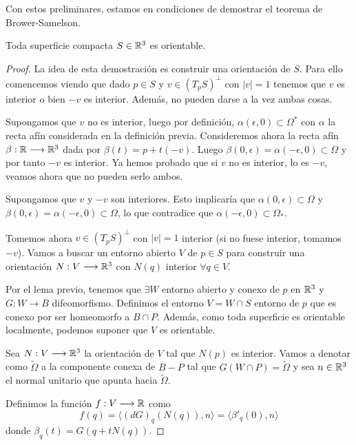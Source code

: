 Con estos preliminares, estamos en condiciones de demostrar el teorema de Brower-Samelson.

\begin{theorem}\label{browersamelson}
Toda superficie compacta $S \in \mathbb{R}^3$ es orientable.
\end{theorem}
\begin{proof}
La idea de esta demostración es construir una orientación de $S$. Para ello comencemos viendo que dado $p \in S$ y $v \in (T_pS)^{\bot}$ con $|v|=1$ tenemos que $v$ es interior o bien $-v$ es interior. Además, no pueden darse a la vez ambas cosas.

Supongamos que $v$ no es interior, luego por definición, $\alpha(\epsilon, 0) \subset \Omega^{*}$ con $\alpha$ la recta afín considerada en la definición previa. Consideremos ahora la recta afín $\beta: \mathbb{R} \longrightarrow \mathbb{R}^3$ dada por $\beta(t)=p + t(-v)$. Luego $\beta(0, \epsilon) = \alpha(-\epsilon, 0) \subset \Omega$ y por tanto $-v$ es interior. Ya hemos probado que si $v$ no es interior, lo es $-v$, veamos ahora que no pueden serlo ambos. 

Supongamos que $v$ y $-v$ son interiores. Esto implicaría que $\alpha(0,\epsilon) \subset \Omega$ y $\beta(0, \epsilon) = \alpha(-\epsilon, 0) \subset \Omega$, lo que contradice que $\alpha(-\epsilon, 0) \subset \Omega_*$.

Tomemos ahora $v \in (T_pS)^{\bot}$ con $|v|=1$ interior (si no fuese interior, tomamos $-v$). Vamos a buscar un entorno abierto $V$ de $p \in S$ para construir una orientación $N: V \longrightarrow \mathbb{R}^3$ con $N(q)$ interior $\forall q \in V.$

Por el lema previo, tenemos que $\exists W$ entorno abierto y conexo de $p$ en $\mathbb{R}^3$ y $G: W \longrightarrow B$ difeomorfismo. Definimos el entorno $V=W\cap S$ entorno de $p$ que es conexo por ser homeomorfo a $B\cap P$. Además, como toda superficie es orientable localmente, podemos suponer que $V$ es orientable.

Sea $N: V \longrightarrow \mathbb{R}^3$ la orientación de $V$ tal que $N(p)$ es interior. Vamos a denotar como $\tilde{\Omega}$ a la componente conexa de $B-P$ tal que $G(W\cap P) = \tilde{\Omega}$ y sea $n \in \mathbb{R}^3$ el normal unitario que apunta hacia $\tilde{\Omega}$.

Definimos la función $f: V \longrightarrow \mathbb{R}$ como 
%
\begin{equation*}
    f(q) = \langle (dG)_q(N(q)), n \rangle = \langle \beta'_q(0), n \rangle
\end{equation*}
%
donde $\beta_q(t) = G(q + tN(q))$.


\end{proof}
